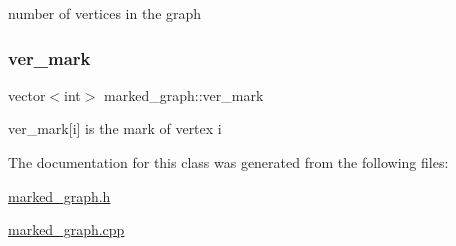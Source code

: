 number of vertices in the graph 

\mbox{\label{classmarked__graph_ac83e9377dd4d8bb95be1ac949b127296}} 
\subsubsection{\texorpdfstring{ver\+\_\+mark}{ver\_mark}}
{\footnotesize\ttfamily vector$<$int$>$ marked\+\_\+graph\+::ver\+\_\+mark}



ver\+\_\+mark\mbox{[}i\mbox{]} is the mark of vertex i 



The documentation for this class was generated from the following files\+:\begin{DoxyCompactItemize}
\item 
\hyperlink{marked__graph_8h}{marked\+\_\+graph.\+h}\item 
\hyperlink{marked__graph_8cpp}{marked\+\_\+graph.\+cpp}\end{DoxyCompactItemize}
